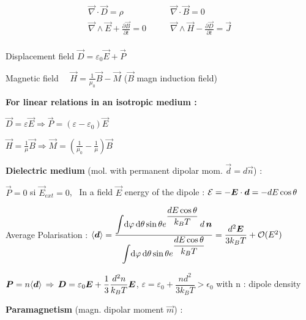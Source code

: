 \item[] $$\boxed{\begin{split}
	\vec{\nabla}\cdot\vec{D} = \rho  \qquad &\vec{\nabla} \cdot \vec{B} = 0\\
	\vec{\nabla}\wedge \vec{E} + \frac{\partial\vec{B}}{\partial t} = 0 \qquad & \vec{\nabla} \wedge \vec{H} - \frac{\partial \vec{D}}{\partial t} = \vec{J}\\
	\end{split}}$$
\item Displacement field $\vec{D}=\varepsilon_0\vec{E}+\vec{P} \quad $

\item Magnetic field $\quad \vec{H}=\frac{1}{\mu_0}\vec{B}-\vec{M}$ ($\vec{B}$ magn induction field)

\item[] \textbf{For linear relations in an isotropic medium :}
\item $\vec{D}=\varepsilon\vec{E}\Rightarrow\vec{P}=(\varepsilon-\varepsilon_0)\vec{E} \quad$ 

\item $\vec{H} = \frac{1}{\mu}\vec{B} \Rightarrow \vec{M} =  \left(\frac{1}{\mu_0} - \frac{1}{\mu}\right) \vec{B}$

\item[] \textbf{Dielectric medium} (mol. with permanent dipolar mom. $\vec{d} = d\vec{n}$) :

\item $\vec{P} = 0$ si $\vec{E}_{ext} =0$, \, In a field $\vec{E}$ energy of the dipole : $\mathcal{E} = -\mbox{\boldmath$E$}\cdot\mbox{\boldmath$d$} = - dE\cos\theta$\\

\item Average Polarisation : $\langle\mbox{\boldmath$d$}\rangle = \dfrac{\displaystyle{\int} \textrm{d} \varphi \, \textrm{d} \theta \sin\theta e^{\dfrac{d E \cos\theta}{k_BT}}\,d \,\mbox{\boldmath$n$}}{\displaystyle{\int} \textrm{d} \varphi \, \textrm{d} \theta \sin\theta e^{\dfrac{d E \cos\theta}{k_B T}}} = \dfrac{d^2 \mbox{\boldmath$E$}}{3k_BT} + \mathcal{O}(E^2) $

\item $\mbox{\boldmath$P$} = n\langle\mbox{\boldmath$d$}\rangle \, \Rightarrow \, \mbox{\boldmath$D$} = \varepsilon_0 \mbox{\boldmath$E$} + \dfrac{1}{3} \dfrac{d^2 n}{k_B T}\mbox{\boldmath$E$}$, $\varepsilon = \varepsilon_0 + \dfrac{nd^2}{3k_B T} > \epsilon_0$ with n : dipole density


\item[] \textbf{Paramagnetism} (magn. dipolar moment $\vec{m}$) :

